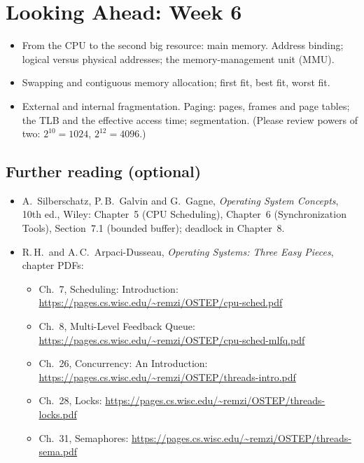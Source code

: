 \documentclass[11pt,a4paper]{article}
\begin{document}
\section{Looking Ahead: Week 6}

\begin{itemize}
  \item From the CPU to the second big resource: main memory. Address binding; logical versus physical addresses; the memory-management unit (MMU).
  \item Swapping and contiguous memory allocation; first fit, best fit, worst fit.
  \item External and internal fragmentation. Paging: pages, frames and page tables; the TLB and the effective access time; segmentation. (Please review powers of two: $2^{10} = 1024$, $2^{12} = 4096$.)
\end{itemize}

\subsection*{Further reading (optional)}
{\small
\begin{itemize}[itemsep=0.1em]
  \item A.\ Silberschatz, P.\,B.\ Galvin and G.\ Gagne, \emph{Operating System Concepts}, 10th ed., Wiley: Chapter~5 (CPU Scheduling), Chapter~6 (Synchronization Tools), Section~7.1 (bounded buffer); deadlock in Chapter~8.
  \item R.\,H.\ and A.\,C.\ Arpaci-Dusseau, \emph{Operating Systems: Three Easy Pieces}, chapter PDFs:
  \begin{itemize}[itemsep=0em]
    \item Ch.~7, Scheduling: Introduction: \url{https://pages.cs.wisc.edu/~remzi/OSTEP/cpu-sched.pdf}
    \item Ch.~8, Multi-Level Feedback Queue: \url{https://pages.cs.wisc.edu/~remzi/OSTEP/cpu-sched-mlfq.pdf}
    \item Ch.~26, Concurrency: An Introduction: \url{https://pages.cs.wisc.edu/~remzi/OSTEP/threads-intro.pdf}
    \item Ch.~28, Locks: \url{https://pages.cs.wisc.edu/~remzi/OSTEP/threads-locks.pdf}
    \item Ch.~31, Semaphores: \url{https://pages.cs.wisc.edu/~remzi/OSTEP/threads-sema.pdf}
  \end{itemize}
\end{itemize}}
\end{document}

